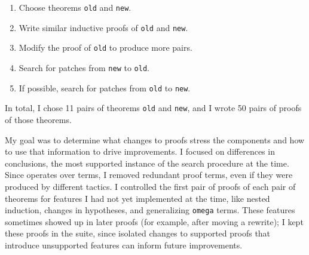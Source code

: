 \begin{enumerate}
\item Choose theorems \lstinline{old} and \lstinline{new}.
\item Write similar inductive proofs of \lstinline{old} and \lstinline{new}.
\item Modify the proof of \lstinline{old} to produce more pairs.
\item Search for patches from \lstinline{new} to \lstinline{old}.
\item If possible, search for patches from \lstinline{old} to \lstinline{new}.
\end{enumerate}
In total, I chose 11 pairs of theorems \lstinline{old} and \lstinline{new}, and I wrote
50 pairs of proofs of those theorems.

\iffalse
For example, one pair of theorems \lstinline{old} and \lstinline{new} was a 
simplification of the auxiliary lemmas
that we encountered in the case study in Section~\ref{sec:foundations}.
For the first proof of \lstinline{old}, we added a rewrite, like in the case study:

\begin{lstlisting}[language=coq]
    (@\diff{rewrite <- plus\_n\_O.}@) rewrite -> plus_comm.
\end{lstlisting}

For the second proof of \lstinline{old}, we commuted the rewrites:

\begin{lstlisting}[language=coq]
    rewrite -> plus_comm. (@\diff{rewrite <- plus\_n\_O.}@)
\end{lstlisting} 

We then searched for patches in both directions,
since the conclusions of \lstinline{old}
and \lstinline{new} were propositionally equal.
\fi

My goal was to determine what changes to proofs stress the components
and how to use that information to drive improvements.
I focused on differences in conclusions, the most supported instance of the search procedure at the time.
Since \sysname operates over terms,
I removed redundant proof terms, even if they were produced by different tactics.
I controlled the first pair of proofs of each pair of theorems for features I had not yet implemented at the time,
like nested induction, changes in hypotheses, and generalizing \lstinline{omega} terms.
These features sometimes showed up in later proofs (for example, after moving a rewrite);
I kept these proofs in the suite, since isolated changes to supported proofs that
introduce unsupported features can inform future improvements.	

